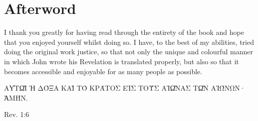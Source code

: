 \chapter*{Afterword}

I thank you greatly for having read through the entirety of the book and hope that you enjoyed yourself whilst doing so. I have, to the best of my abilities, tried doing the original work justice, so that not only the unique and colourful manner in which John wrote his Revelation is translated properly, but also so that it becomes accessible and enjoyable for as many people as possible.

\bigskip\bigskip

\epigraph{\uppercase{αὐτῷ ἡ δόξα καὶ τὸ κράτος εἰς τοὺς αἰῶνας τῶν αἰώνων· ἀμήν.}}{Rev. 1:6}